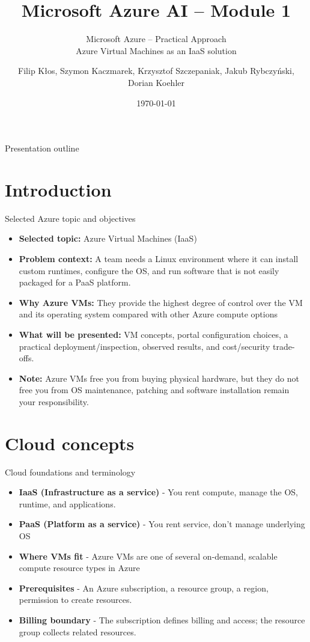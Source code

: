 \documentclass[aspectratio=169,xcolor=dvipsnames]{beamer}
\title[Azure AI -- Module 1]{Microsoft Azure AI -- Module 1}
\subtitle{Microsoft Azure -- Practical Approach \\ Azure Virtual Machines as an IaaS solution}
\author[Student / team]{Filip Kłos, Szymon Kaczmarek, Krzysztof Szczepaniak, Jakub Rybczyński, Dorian Koehler}
\institute[SUT]{Faculty of Applied Mathematics\\Silesian University of Technology}
\date{\today}
\begin{document}
\begin{frame}
\titlepage
\end{frame}
\begin{frame}{Presentation outline}
\tableofcontents
\end{frame}
\section{Introduction}
\begin{frame}{Selected Azure topic and objectives}
\begin{itemize}
\item \textbf{Selected topic:} Azure Virtual Machines (IaaS)
\item \textbf{Problem context:} A team needs a Linux environment where it can install custom runtimes, configure the OS, and run software that is not easily packaged for a PaaS platform.
\item \textbf{Why Azure VMs:} They provide the highest degree of control over the VM and its operating system compared with other Azure compute options
\item \textbf{What will be presented:} VM concepts, portal configuration choices, a practical deployment/inspection, observed results, and cost/security trade-offs.
\item \textbf{Note:} Azure VMs free you from buying physical hardware, but they do not free you from OS maintenance, patching and software installation remain your responsibility.
\end{itemize}
\end{frame}
\section{Cloud concepts}
\begin{frame}{Cloud foundations and terminology}
	\begin{itemize}
		\item \textbf{IaaS (Infrastructure as a service)} - You rent compute, manage the OS, runtime, and applications.
		\item \textbf{PaaS (Platform as a service)} - You rent service, don't manage underlying OS
		\item \textbf{Where VMs fit} - Azure VMs are one of several on-demand, scalable compute resource types in Azure
		\item \textbf{Prerequisites} - An Azure subscription, a resource group, a region, permission to create resources.
		\item \textbf{Billing boundary} - The subscription defines billing and access; the resource group collects related resources.
	\end{itemize}
\end{frame}
\end{document}
